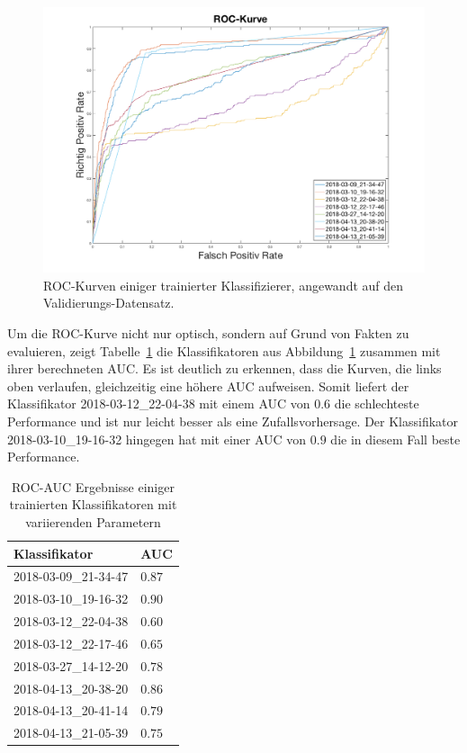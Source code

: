 \begin{figure}[htb!]
	\begin{center}
		\includegraphics[width=\textwidth]{pics/evaluation/roc_analysis.png}
		\caption{ROC-Kurven einiger trainierter Klassifizierer, angewandt auf den Validierungs-Datensatz.}
		\label{fig:roc}
    \end{center}
\end{figure}

Um die ROC-Kurve nicht nur optisch, sondern auf Grund von Fakten zu evaluieren, zeigt Tabelle~\ref{tab:auc} die Klassifikatoren aus Abbildung~\ref{fig:roc} zusammen mit ihrer berechneten AUC. Es ist deutlich zu erkennen, dass die Kurven, die links oben verlaufen, gleichzeitig eine höhere AUC aufweisen. Somit liefert der Klassifikator 2018-03-12\_22-04-38 mit einem AUC von $0.6$ die schlechteste Performance und ist nur leicht besser als eine Zufallsvorhersage. Der Klassifikator 2018-03-10\_19-16-32 hingegen hat mit einer AUC von $0.9$ die in diesem Fall beste Performance. 

\begin{table}[htb!]
\begin{center}
\begin{tabular}{ll}
	\toprule
 	Klassifikator  & AUC\\
	\midrule
  	2018-03-09\_21-34-47 &   $0.87$\\
    2018-03-10\_19-16-32 &   $0.90$\\
    2018-03-12\_22-04-38 &   $0.60$\\
    2018-03-12\_22-17-46 &   $0.65$\\
    2018-03-27\_14-12-20 &   $0.78$\\
    2018-04-13\_20-38-20 &   $0.86$\\
    2018-04-13\_20-41-14 &   $0.79$\\
    2018-04-13\_21-05-39 &   $0.75$\\
 \bottomrule
 \end{tabular}
 \end{center}
  \caption{ROC-AUC Ergebnisse einiger trainierten Klassifikatoren mit variierenden Parametern}
 \label{tab:auc}
 \end{table}
 
